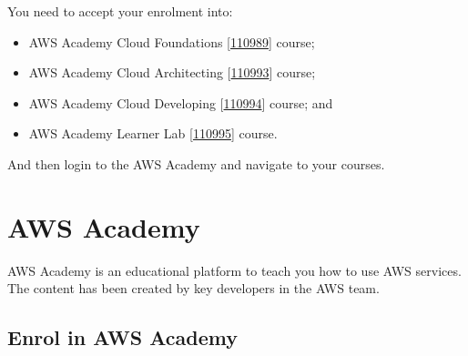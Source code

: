 You need to accept your enrolment into:
\begin{itemize}
    \item AWS Academy Cloud Foundations [\href{https://awsacademy.instructure.com/courses/110989}{110989}] course;
    \item AWS Academy Cloud Architecting [\href{https://awsacademy.instructure.com/courses/110993}{110993}] course;
    \item AWS Academy Cloud Developing [\href{https://awsacademy.instructure.com/courses/110994}{110994}] course; and
    \item AWS Academy Learner Lab [\href{https://awsacademy.instructure.com/courses/110995}{110995}] course.
\end{itemize}
And then login to the AWS Academy and navigate to your courses.

\section{AWS Academy}
AWS Academy is an educational platform to teach you how to use AWS services.
The content has been created by key developers in the AWS team.

\subsection{Enrol in AWS Academy}

